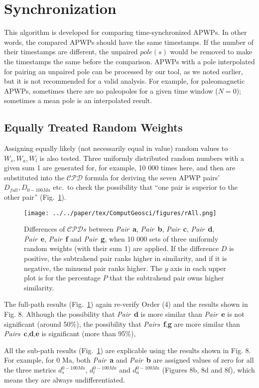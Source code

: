 \section{Synchronization}
This algorithm is developed for comparing time-synchronized APWPs. In other
words, the compared APWPs should have the same timestamps. If the number of
their timestamps are different, the unpaired $pole(s)$ would be removed to make
the timestamps the same before the comparison. APWPs with a pole interpolated
for pairing an unpaired pole can be processed by our tool, as we noted earlier,
but it is not recommended for a valid analysis. For example, for paleomagnetic
APWPs, sometimes there are no paleopoles for a given time window ($N=0$);
sometimes a mean pole is an interpolated result.

\subsection{Equally Treated Random Weights}
Assigning equally likely (not necessarily equal in value) random values to
$W_s,W_a,W_l$ is also tested. Three uniformly distributed random numbers with a
given sum 1 are generated for, for example, 10 000 times here, and then are
substituted into the $\mathcal{CPD}$ formula for deriving the seven APWP
pairs' $D_{full},D_{0-100Ma}$ etc.\ to check the possibility that ``one pair is
superior to the other pair'' (Fig.~\ref{fig:rall}).

\begin{figure}[tbp]
\centering
\texttt{[image: ../../paper/tex/ComputGeosci/figures/rAll.png]}
\caption[Comparisons of Pairs a-g with random weights involved]{Differences of
$\mathcal{CPD}s$ between \emph{Pair}~\textbf{a}, \emph{Pair}~\textbf{b},
\emph{Pair}~\textbf{c}, \emph{Pair}~\textbf{d}, \emph{Pair}~\textbf{e},
\emph{Pair}~\textbf{f} and \emph{Pair}~\textbf{g}, when 10 000 sets of three
uniformly random weights (with
their sum 1) are applied. If the difference $D$ is positive, the subtrahend pair
ranks higher in similarity, and if it is negative, the minuend pair ranks
higher. The $y$ axis in each upper plot is for the percentage $P$ that the
subtrahend pair owns higher similarity.}\label{fig:rall}
\end{figure}

The full-path results (Fig.~\ref{fig:rall}) again re-verify Order (4) and
the results shown in Fig. 8. Although the possibility that
\emph{Pair}~\textbf{d} is more similar than \emph{Pair}~\textbf{e} is not
significant (around 50\%), the possibility that
\emph{Pairs}~\textbf{f},\textbf{g} are more similar than
\emph{Pairs}~\textbf{c},\textbf{d},\textbf{e} is significant (more than 95\%),

All the sub-path results (Fig.~\ref{fig:rall}) are explicable using the results
shown in Fig. 8. For example, for 0 Ma, both
\emph{Pair}~\textbf{a} and \emph{Pair}~\textbf{b} are assigned values of zero
for all the three metrics $d_s^{0-100Ma}$, $d_l^{0-100Ma}$ and $d_a^{0-100Ma}$
(Figures 8b, 8d and 8f), which means they are always undifferentiated.
